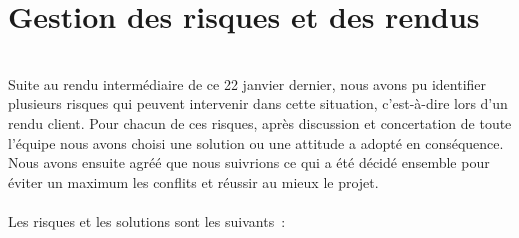 \documentclass{article}
\begin{document}
\section{Gestion des risques et des rendus}
\\
Suite au rendu intermédiaire de ce 22 janvier dernier, nous avons pu identifier plusieurs risques qui peuvent intervenir dans cette situation,
c’est-à-dire lors d’un rendu client. Pour chacun de ces risques, après discussion et concertation de toute l'équipe nous avons choisi une solution ou une attitude a adopté en conséquence.
Nous avons ensuite agréé que nous suivrions ce qui a été décidé ensemble pour éviter un maximum les conflits et réussir au mieux le projet.
\\\\
Les risques et les solutions sont les suivants :
\\
\end{document}
